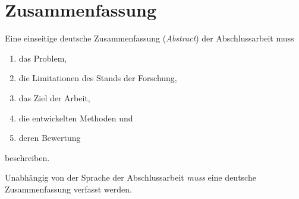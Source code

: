 
\chapter*{Zusammenfassung}

Eine einseitige deutsche Zusammenfassung (\emph{Abstract}) der Abschlussarbeit muss 
\begin{enumerate}[i]
\item das Problem, 
\item die Limitationen des Stands der Forschung, 
\item das Ziel der Arbeit, 
\item die entwickelten Methoden und  
\item deren Bewertung 
\end{enumerate}
beschreiben. 

Unabhängig von der Sprache der Abschlussarbeit \emph{muss} eine deutsche Zusammenfassung verfasst werden.
